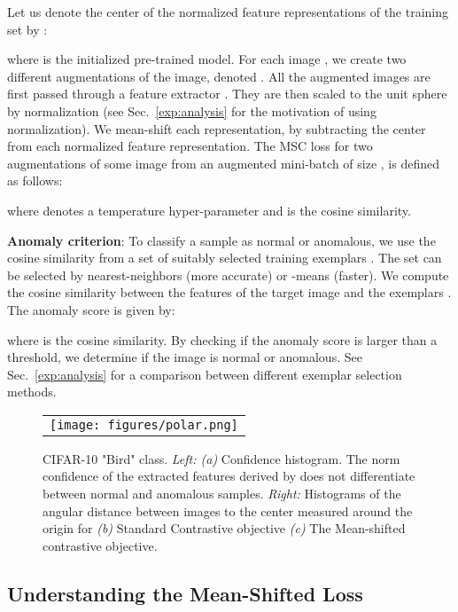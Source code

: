 \documentclass[letterpaper]{article} \usepackage{aaai23}  \usepackage{times}  \usepackage{helvet}  \usepackage{courier}  \usepackage[hyphens]{url}  \usepackage{graphicx} \usepackage{amsmath, amssymb}
\begin{document}
Let us denote the center of the normalized feature representations of the training set by :

where  is the initialized pre-trained model. For each image , we create two different augmentations of the image, denoted . All the augmented images are first passed through a feature extractor . They are then scaled to the unit sphere by  normalization (see Sec.~\ref{exp:analysis} for the motivation of using  normalization). We mean-shift each representation, by subtracting the center  from each normalized feature representation. The MSC loss for two augmentations  of some image  from an augmented mini-batch of size , is defined as follows:

where  denotes a temperature hyper-parameter and  is the cosine similarity. 

\textbf{Anomaly criterion}: To classify a sample as normal or anomalous, we use the cosine similarity from a set of  suitably selected training exemplars . The set  can be selected by  nearest-neighbors (more accurate) or -means (faster). We compute the cosine similarity between the features of the target image  and the  exemplars . The anomaly score is given by:

where  is the cosine similarity. By checking if the anomaly score  is larger than a threshold, we determine if the image  is normal or anomalous. See Sec.~\ref{exp:analysis} for a comparison between different exemplar selection methods.

\begin{figure*}[t]
  \centering
    \begin{tabular}{c}
    \texttt{[image: figures/polar.png]} 
    \end{tabular}
    \caption{CIFAR-10 "Bird" class. \textit{Left: (a)} Confidence histogram. The  norm confidence of the extracted features derived by  does not differentiate between normal and anomalous samples. \textit{Right: }Histograms of the angular distance between images to the center measured around the origin for \textit{(b)} Standard Contrastive objective \textit{(c)} The Mean-shifted contrastive objective.}
     \label{fig:polar}

\end{figure*}


\subsection{Understanding the Mean-Shifted Loss}
\label{met:msc_explained}
\end{document}
